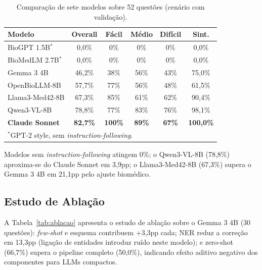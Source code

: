 \documentclass[12pt]{article}
\begin{document}
\begin{table}[H]
\centering
\caption{Compara\c{c}\~{a}o de sete modelos sobre 52 quest\~{o}es (cen\'{a}rio com valida\c{c}\~{a}o).}
\label{tab:zeroshot}
\scriptsize
\begin{tabular}{lccccc}
\toprule
\textbf{Modelo} & \textbf{Overall} & \textbf{F\'{a}cil} & \textbf{M\'{e}dio} & \textbf{Dif\'{i}cil} & \textbf{Sint.} \\
\midrule
BioGPT 1.5B$^*$        &  0,0\% &  0\% &  0\% &  0\% &  0,0\% \\
BioMedLM 2.7B$^*$      &  0,0\% &  0\% &  0\% &  0\% &  0,0\% \\
Gemma 3 4B             & 46,2\% & 38\% & 56\% & 43\% & 75,0\% \\
OpenBioLLM-8B          & 57,7\% & 77\% & 56\% & 48\% & 61,5\% \\
Llama3-Med42-8B        & 67,3\% & 85\% & 61\% & 62\% & 90,4\% \\
Qwen3-VL-8B            & 78,8\% & 77\% & 83\% & 76\% & 98,1\% \\
\textbf{Claude Sonnet} & \textbf{82,7\%} & \textbf{100\%} & \textbf{89\%} & \textbf{67\%} & \textbf{100,0\%} \\
\bottomrule
\multicolumn{6}{l}{$^*$GPT-2 style, sem \textit{instruction-following}.}
\end{tabular}
\end{table}

Modelos sem \textit{instruction-following} atingem 0\%; o Qwen3-VL-8B (78,8\%) aproxima-se do Claude Sonnet em 3,9pp; o Llama3-Med42-8B (67,3\%) supera o Gemma 3 4B em 21,1pp pelo ajuste biom\'{e}dico.


\subsection{Estudo de Abla\c{c}\~{a}o}
\label{sec:ablacao}

A Tabela~\ref{tab:ablacao} apresenta o estudo de abla\c{c}\~{a}o sobre o Gemma 3 4B (30 quest\~{o}es): \textit{few-shot} e esquema contribuem +3,3pp cada; NER reduz a corre\c{c}\~{a}o em 13,3pp (liga\c{c}\~{a}o de entidades introduz ru\'{i}do neste modelo); e zero-shot (66,7\%) supera o pipeline completo (50,0\%), indicando efeito aditivo negativo dos componentes para LLMs compactos.
\end{document}
